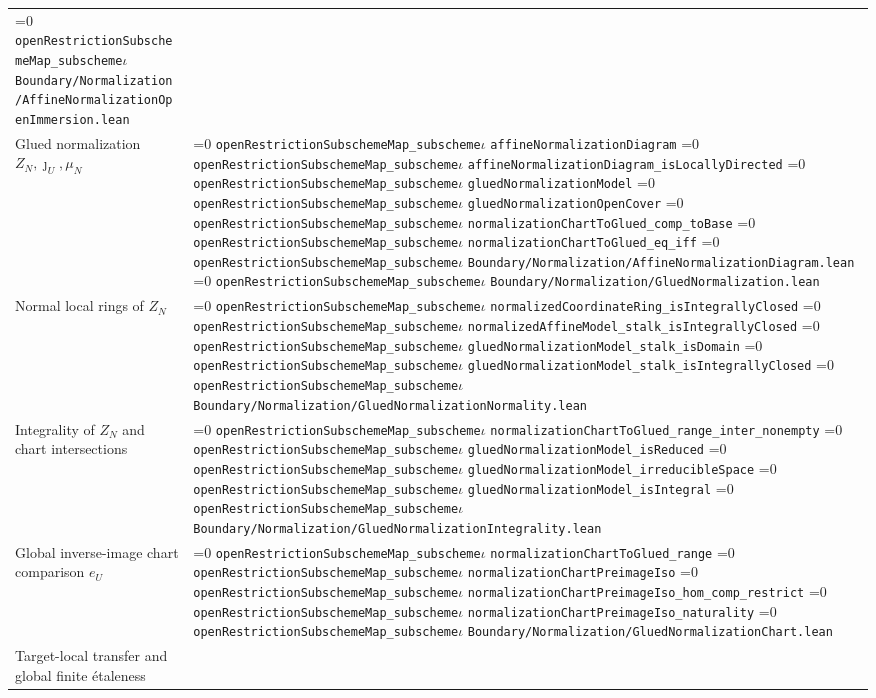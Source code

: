\documentclass[11pt]{article}
\theoremstyle{definition}
\theoremstyle{remark}
\newcommand{\leanpath}[1]{%
  \ifnum\pdfstrcmp{\detokenize{#1}}%
      {\detokenize{openRestrictionSubschemeMap_subschemeι}}=0
    \texttt{\nolinkurl{openRestrictionSubschemeMap_subscheme}}\ensuremath{\iota}%
  \else
    \texttt{\nolinkurl{#1}}%
  \fi}
\begin{document}
\begin{longtable}{@{}>{\raggedright\arraybackslash}p{}
                >{\raggedright\arraybackslash}p{}@{}}
\leanpath{Boundary/Normalization/AffineNormalizationOpenImmersion.lean}\\
Glued normalization \(Z_N,\jmath_U,\mu_N\) &
\leanpath{affineNormalizationDiagram}\newline
\leanpath{affineNormalizationDiagram_isLocallyDirected}\newline
\leanpath{gluedNormalizationModel}\newline
\leanpath{gluedNormalizationOpenCover}\newline
\leanpath{normalizationChartToGlued_comp_toBase}\newline
\leanpath{normalizationChartToGlued_eq_iff}\newline
\leanpath{Boundary/Normalization/AffineNormalizationDiagram.lean}\newline
\leanpath{Boundary/Normalization/GluedNormalization.lean}\\
Normal local rings of \(Z_N\) &
\leanpath{normalizedCoordinateRing_isIntegrallyClosed}\newline
\leanpath{normalizedAffineModel_stalk_isIntegrallyClosed}\newline
\leanpath{gluedNormalizationModel_stalk_isDomain}\newline
\leanpath{gluedNormalizationModel_stalk_isIntegrallyClosed}\newline
\leanpath{Boundary/Normalization/GluedNormalizationNormality.lean}\\
Integrality of \(Z_N\) and chart intersections &
\leanpath{normalizationChartToGlued_range_inter_nonempty}\newline
\leanpath{gluedNormalizationModel_isReduced}\newline
\leanpath{gluedNormalizationModel_irreducibleSpace}\newline
\leanpath{gluedNormalizationModel_isIntegral}\newline
\leanpath{Boundary/Normalization/GluedNormalizationIntegrality.lean}\\
Global inverse-image chart comparison \(e_U\) &
\leanpath{normalizationChartToGlued_range}\newline
\leanpath{normalizationChartPreimageIso}\newline
\leanpath{normalizationChartPreimageIso_hom_comp_restrict}\newline
\leanpath{normalizationChartPreimageIso_naturality}\newline
\leanpath{Boundary/Normalization/GluedNormalizationChart.lean}\\
Target-local transfer and global finite \'{e}taleness &

\end{longtable}
\end{document}
